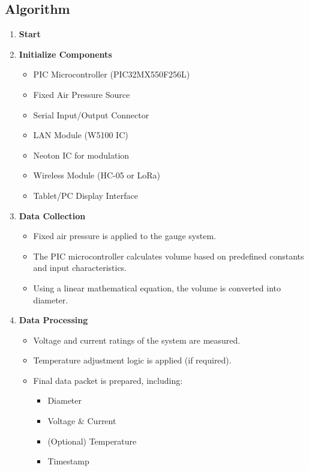 \documentclass[12pt]{report}
\begin{document}
\subsection{Algorithm}
\begin{enumerate}
    \item \textbf{Start}
    \item \textbf{Initialize Components}
    \begin{itemize}
        \item PIC Microcontroller (PIC32MX550F256L)
        \item Fixed Air Pressure Source
        \item Serial Input/Output Connector
        \item LAN Module (W5100 IC)
        \item Neoton IC for modulation
        \item Wireless Module (HC-05 or LoRa)
        \item Tablet/PC Display Interface
    \end{itemize}
    
    \item \textbf{Data Collection}
    \begin{itemize}
        \item Fixed air pressure is applied to the gauge system.
        \item The PIC microcontroller calculates volume based on predefined constants and input characteristics.
        \item Using a linear mathematical equation, the volume is converted into diameter.
    \end{itemize}
    
    \item \textbf{Data Processing}
    \begin{itemize}
        \item Voltage and current ratings of the system are measured.
        \item Temperature adjustment logic is applied (if required).
        \item Final data packet is prepared, including:
        \begin{itemize}
            \item Diameter
            \item Voltage \& Current
            \item (Optional) Temperature
            \item Timestamp
        \end{itemize}
    \end{itemize}
    

\end{enumerate}
\end{document}
